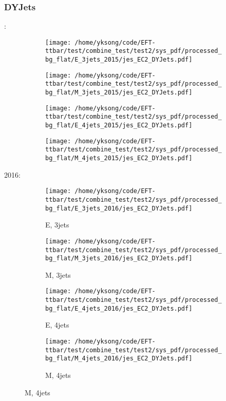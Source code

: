 \documentclass{beamer}
\begin{document}
\begin{frame}
\frametitle{DYJets}
\fontsize{5}{1}:
\begin{figure}
\centering
\begin{subfigure}[b]{0.24\textwidth}
\texttt{[image: /home/yksong/code/EFT-ttbar/test/combine\_test/test2/sys\_pdf/processed\_bg\_flat/E\_3jets\_2015/jes\_EC2\_DYJets.pdf]}
\end{subfigure}
\begin{subfigure}[b]{0.24\textwidth}
\texttt{[image: /home/yksong/code/EFT-ttbar/test/combine\_test/test2/sys\_pdf/processed\_bg\_flat/M\_3jets\_2015/jes\_EC2\_DYJets.pdf]}
\end{subfigure}
\begin{subfigure}[b]{0.24\textwidth}
\texttt{[image: /home/yksong/code/EFT-ttbar/test/combine\_test/test2/sys\_pdf/processed\_bg\_flat/E\_4jets\_2015/jes\_EC2\_DYJets.pdf]}
\end{subfigure}
\begin{subfigure}[b]{0.24\textwidth}
\texttt{[image: /home/yksong/code/EFT-ttbar/test/combine\_test/test2/sys\_pdf/processed\_bg\_flat/M\_4jets\_2015/jes\_EC2\_DYJets.pdf]}
\end{subfigure}
\end{figure}
2016:
\begin{figure}
\centering
\begin{subfigure}[b]{0.24\textwidth}
\texttt{[image: /home/yksong/code/EFT-ttbar/test/combine\_test/test2/sys\_pdf/processed\_bg\_flat/E\_3jets\_2016/jes\_EC2\_DYJets.pdf]}
\captionsetup{font=tiny}
\caption{E, 3jets}
\end{subfigure}
\begin{subfigure}[b]{0.24\textwidth}
\texttt{[image: /home/yksong/code/EFT-ttbar/test/combine\_test/test2/sys\_pdf/processed\_bg\_flat/M\_3jets\_2016/jes\_EC2\_DYJets.pdf]}
\captionsetup{font=tiny}
\caption{M, 3jets}
\end{subfigure}
\begin{subfigure}[b]{0.24\textwidth}
\texttt{[image: /home/yksong/code/EFT-ttbar/test/combine\_test/test2/sys\_pdf/processed\_bg\_flat/E\_4jets\_2016/jes\_EC2\_DYJets.pdf]}
\captionsetup{font=tiny}
\caption{E, 4jets}
\end{subfigure}
\begin{subfigure}[b]{0.24\textwidth}
\texttt{[image: /home/yksong/code/EFT-ttbar/test/combine\_test/test2/sys\_pdf/processed\_bg\_flat/M\_4jets\_2016/jes\_EC2\_DYJets.pdf]}
\captionsetup{font=tiny}
\caption{M, 4jets}
\end{subfigure}
\end{figure}
\end{frame}
\end{document}

